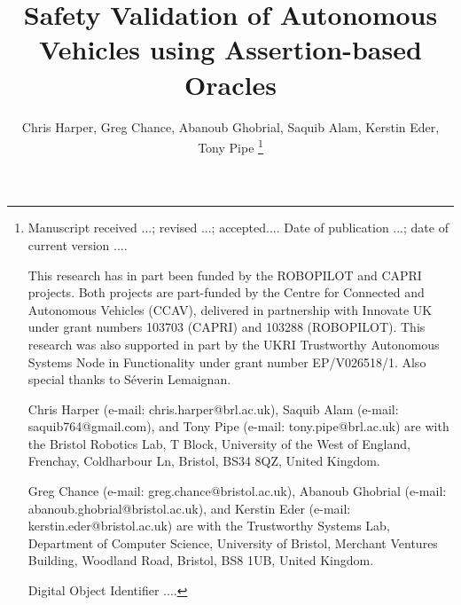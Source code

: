 \documentclass[letterpaper, 10 pt, journal, twoside]{IEEEtran}
\begin{document}
\title{Safety Validation of Autonomous Vehicles using Assertion-based Oracles}

\author{Chris Harper, Greg Chance, Abanoub Ghobrial, Saquib Alam, Kerstin Eder, Tony Pipe 
\thanks{{\footnotesize
Manuscript  
received ...;
revised ...;  
accepted.... 
Date of publication ...;
date of current version ....

This research has in part been funded by the ROBOPILOT and CAPRI projects. Both projects are part-funded by the Centre for Connected and Autonomous Vehicles (CCAV), delivered in partnership with Innovate UK under grant numbers 103703 (CAPRI) and 103288 (ROBOPILOT). This research was also supported in part by the UKRI Trustworthy Autonomous Systems Node in Functionality under grant number EP/V026518/1. Also special thanks to S\'everin Lemaignan.


Chris Harper (e-mail: chris.harper@brl.ac.uk),
Saquib Alam (e-mail: saquib764@gmail.com),
and
Tony Pipe (e-mail: tony.pipe@brl.ac.uk) 
are with the Bristol Robotics Lab, T Block, University of the West of England, Frenchay, Coldharbour Ln, Bristol, BS34 8QZ, United Kingdom. 

Greg Chance (e-mail: greg.chance@bristol.ac.uk), 
Abanoub Ghobrial (e-mail: abanoub.ghobrial@bristol.ac.uk), 
and 
Kerstin Eder (e-mail: kerstin.eder@bristol.ac.uk) 
are with the Trustworthy Systems Lab, Department of Computer Science, University of Bristol, Merchant Ventures Building, Woodland Road, Bristol, BS8 1UB, United Kingdom. 

Digital Object Identifier ....
}}}
%
%
\maketitle

\begin{abstract}
\noindent 

\end{abstract}
\end{document}
